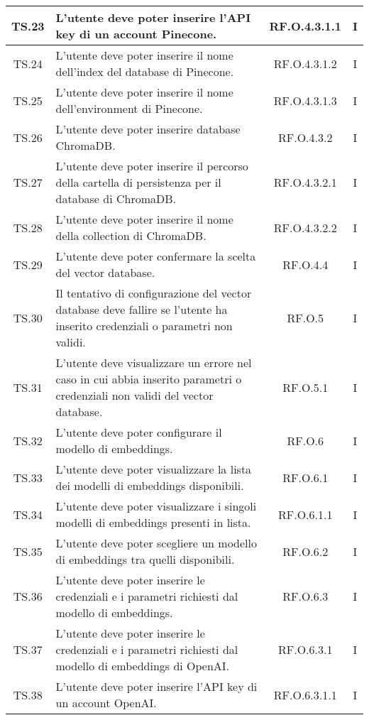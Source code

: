 {{{{{{{{{\begin{xltabular}{\textwidth}{|c|X|c|c|}
    \hline
    TS.23 & L’utente deve poter inserire l’API key di un account Pinecone. & RF.O.4.3.1.1 & I \\
    \hline
    TS.24 & L’utente deve poter inserire il nome dell’index del database di Pinecone. & RF.O.4.3.1.2 & I \\
    \hline
    TS.25 & L’utente deve poter inserire il nome dell’environment di Pinecone. & RF.O.4.3.1.3 & I \\
    \hline
    TS.26 & L’utente deve poter inserire database ChromaDB. & RF.O.4.3.2 & I \\
    \hline
    TS.27 & L’utente deve poter inserire il percorso della cartella di persistenza per il database di ChromaDB. & RF.O.4.3.2.1 & I \\
    \hline
    TS.28 & L’utente deve poter inserire il nome della collection di ChromaDB. & RF.O.4.3.2.2 & I \\
    \hline
    TS.29 & L’utente deve poter confermare la scelta del vector database. & RF.O.4.4 & I \\
    \hline
    TS.30 & Il tentativo di configurazione del vector database deve fallire se l’utente ha inserito credenziali o parametri non validi. & RF.O.5 & I \\
    \hline
    TS.31 & L’utente deve visualizzare un errore nel caso in cui abbia inserito parametri o credenziali non validi del vector database. & RF.O.5.1 & I \\
    \hline
    TS.32 & L’utente deve poter configurare il modello di embeddings. & RF.O.6 & I \\
    \hline
    TS.33 & L’utente deve poter visualizzare la lista dei modelli di embeddings disponibili. & RF.O.6.1 & I \\
    \hline
    TS.34 & L’utente deve poter visualizzare i singoli modelli di embeddings presenti in lista. & RF.O.6.1.1 & I \\
    \hline
    TS.35 & L’utente deve poter scegliere un modello di embeddings tra quelli disponibili. & RF.O.6.2 & I \\
    \hline
    TS.36 & L’utente deve poter inserire le credenziali e i parametri richiesti dal modello di embeddings. & RF.O.6.3 & I \\
    \hline
    TS.37 & L’utente deve poter inserire le credenziali e i parametri richiesti dal modello di embeddings di OpenAI. & RF.O.6.3.1 & I \\
    \hline
    TS.38 & L’utente deve poter inserire l’API key di un account OpenAI. & RF.O.6.3.1.1 & I \\

\end{xltabular}}}}}}}}}}
